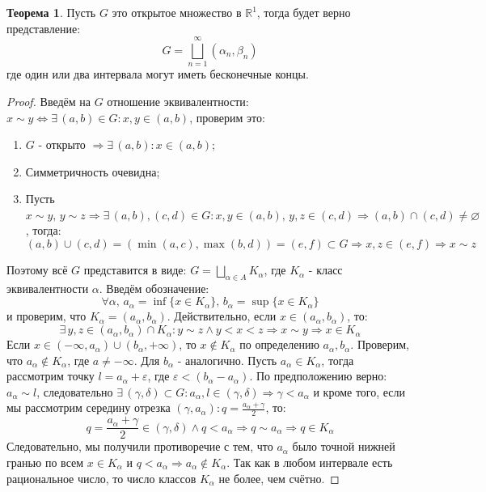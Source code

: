 \documentclass[12pt]{article}
\newcommand{\MR}{\mathbb{R}}
\newcommand{\VN}{\varnothing}
\newcommand{\VE}{\varepsilon}
\theoremstyle{definition}
\newtheorem{theorem}{Теорема}
\begin{document}
\begin{theorem}
	Пусть $G$ это открытое множество в $\MR^1$, тогда будет верно представление: 
	$$
		G = \bigsqcup\limits_{n = 1}^{\infty}(\alpha_n, \beta_n)
	$$ 
	где один или два интервала могут иметь бесконечные концы.
\end{theorem}
\begin{proof}
	Введём на $G$ отношение эквивалентности: $x \sim y\Leftrightarrow \exists \, (a,b) \in G \colon x,y \in (a,b)$, проверим это:
	\begin{enumerate}[label=\arabic*)]
		\item $G$ - открыто $\Rightarrow \exists \, (a,b) \colon x \in (a,b)$;
		\item Симметричность очевидна;
		\item Пусть $x \sim y, \, y \sim z \Rightarrow \exists \, (a,b), (c,d) \in G \colon x,y \in (a,b), \, y,z \in (c,d) \Rightarrow (a,b)\cap (c,d) \neq \VN$, тогда:
		$$
			(a,b) \cup (c,d) = (\min(a,c), \max(b,d)) = (e,f) \subset G \Rightarrow x,z \in (e,f) \Rightarrow x \sim z
		$$
	\end{enumerate}
	Поэтому всё $G$ представится в виде: $G = \bigsqcup\limits_{\alpha \in A}K_\alpha$, где $K_\alpha$ - класс эквивалентности $\alpha$. Введём обозначение:
	$$
		\forall \alpha, \, a_\alpha = \inf\{x \in K_\alpha\}, \, b_\alpha = \sup\{x \in K_\alpha\}
	$$
	и проверим, что $K_\alpha = (a_\alpha, b_\alpha)$. Действительно, если $x \in (a_\alpha,b_\alpha)$, то:
	$$
		\exists \, y,z \in (a_\alpha,b_\alpha) \cap K_\alpha \colon y \sim z \wedge y < x < z \Rightarrow x \sim y \Rightarrow x \in K_\alpha
	$$
	Если $x \in (-\infty,a_\alpha) \cup (b_\alpha, + \infty)$, то $x\not\in K_\alpha$ по определению $a_\alpha, b_\alpha$. Проверим, что $a_\alpha \not\in K_\alpha$, где $a \neq -\infty$. Для $b_\alpha$ - аналогично. Пусть $a_\alpha \in K_\alpha$, тогда рассмотрим точку $l = a_\alpha + \VE$, где $\VE < (b_\alpha - a_\alpha)$. По предположению верно: $a_\alpha \sim l$, следовательно $\exists \, (\gamma,\delta) \subset G \colon a_\alpha, l \in (\gamma,\delta) \Rightarrow \gamma < a_\alpha$ и кроме того, если мы рассмотрим середину отрезка $(\gamma,a_\alpha) \colon q = \tfrac{a_\alpha + \gamma}{2}$, то:
	$$
		q = \dfrac{a_\alpha +  \gamma}{2} \in (\gamma,\delta) \wedge q < a_\alpha \Rightarrow q \sim a_\alpha \Rightarrow q \in K_\alpha
	$$
	Следовательно, мы получили противоречие с тем, что $a_\alpha$ было точной нижней гранью по всем $x \in K_\alpha$ и $q < a_\alpha \Rightarrow a_\alpha \not\in K_\alpha$. Так как в любом интервале есть рациональное число, то число классов $K_\alpha$ не более, чем счётно. 
\end{proof}
\end{document}

